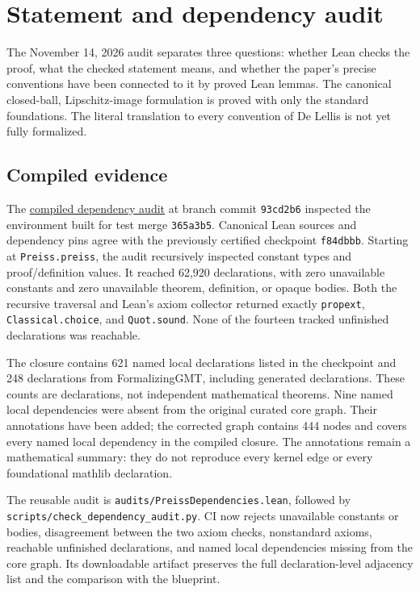 \chapter{Statement and dependency audit}
\label{chapter:statement-audit}

The November 14, 2026 audit separates three questions: whether Lean checks the
proof, what the checked statement means, and whether the paper's precise
conventions have been connected to it by proved Lean lemmas.
The canonical closed-ball, Lipschitz-image formulation is proved with only
the standard foundations. The literal translation to every convention of
De Lellis is not yet fully formalized.

\section{Compiled evidence}
The \href{https://github.com/tdwag123/PreissFormalization/actions/runs/43657459266}{compiled dependency audit}
at branch commit \texttt{93cd2b6} inspected the environment built for test merge
\texttt{365a3b5}. Canonical Lean sources and dependency pins agree with the
previously certified checkpoint \texttt{f84dbbb}.
Starting at \texttt{Preiss.preiss}, the audit recursively inspected constant
types and proof/definition values. It reached 62,920 declarations, with zero
unavailable constants and zero unavailable theorem, definition, or opaque bodies.
Both the recursive traversal and Lean's axiom collector returned exactly
\texttt{propext}, \texttt{Classical.choice}, and \texttt{Quot.sound}.
None of the fourteen tracked unfinished declarations was reachable.

The closure contains 621 named local declarations listed in the checkpoint
and 248 declarations from FormalizingGMT, including generated declarations.
These counts are declarations, not independent mathematical theorems.
Nine named local dependencies were absent from the original curated core
graph. Their annotations have been added; the corrected graph contains
444 nodes and covers every named local dependency in the compiled closure.
The annotations remain a mathematical summary: they do not reproduce every
kernel edge or every foundational mathlib declaration.

The reusable audit is \texttt{audits/PreissDependencies.lean}, followed by
\texttt{scripts/check\_dependency\_audit.py}. CI now rejects unavailable
constants or bodies, disagreement between the two axiom checks, nonstandard
axioms, reachable unfinished declarations, and named local dependencies
missing from the core graph. Its downloadable artifact preserves the full
declaration-level adjacency list and the comparison with the blueprint.

